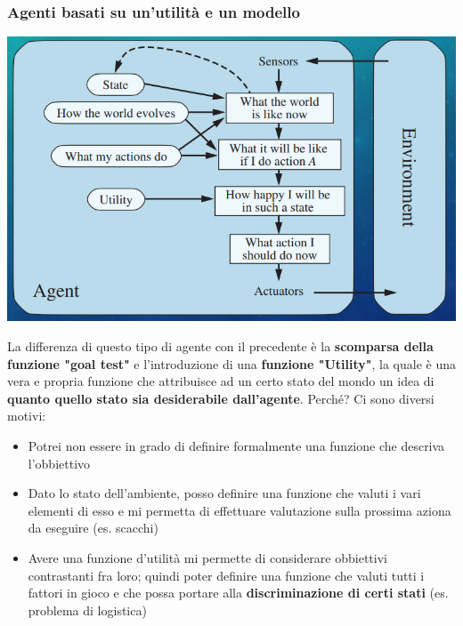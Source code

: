 \documentclass[12pt]{article}
\begin{document}
\subsubsection{Agenti basati su un'utilità e un modello}
\begin{center}
    \includegraphics[width = 0.80\linewidth]{Images/16.PNG}
\end{center}
La differenza di questo tipo di agente con il precedente è la \textbf{scomparsa della funzione "goal test"} e l'introduzione di una \textbf{funzione "Utility"}, la quale è una vera e propria funzione
che attribuisce ad un certo stato del mondo un idea di \textbf{quanto quello stato sia desiderabile dall'agente}. Perché? Ci sono diversi motivi:
\begin{itemize}
    \item Potrei non essere in grado di definire formalmente una funzione che descriva l'obbiettivo
    \item Dato lo stato dell'ambiente, posso definire una funzione che valuti i vari elementi di esso e mi permetta di effettuare valutazione sulla prossima aziona da eseguire (es. scacchi)
    \item Avere una funzione d'utilità mi permette di considerare obbiettivi contrastanti fra loro; quindi poter definire una funzione che valuti tutti i fattori in gioco e che possa portare alla \textbf{discriminazione di certi stati} (es. problema di logistica)
\end{itemize}
\end{document}
